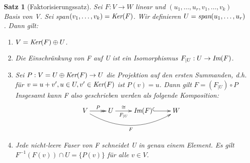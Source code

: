 \documentclass[12pt,a4paper]{article}
\theoremstyle{plain}
\newtheorem{Satz}[Theorem]{Satz}
\numberwithin{equation}{section}
\begin{document}
\begin{Satz} [Faktorisierungssatz]
Sei $F:V\rightarrow W$ linear und $(u_1,\ldots,u_r,v_1,\ldots,v_k)$ Basis von V. Sei \emph{span}$(v_1,\ldots,v_k)=\emph{Ker}(F)$. Wir definieren $U=\emph{span}(u_1,\ldots,u_r)$. Dann gilt:
\begin{enumerate}
\renewcommand{\labelenumi}{\emph{(\roman{enumi})}}
\item $V=\emph{Ker}(F)\oplus U$.
\item Die Einschränkung von F auf U ist ein Isomorphismus $F_{|U}:U\rightarrow \emph{Im}(F)$.
\item Sei $P:V=U\oplus\emph{Ker}(F)\rightarrow U$ die Projektion auf den ersten Summanden, d.h. für $v=u+v', u\in U, v'\in \emph{Ker}(F)$ ist $P(v)=u$. Dann gilt $F=(F_{|U})\circ P$
Insgesamt kann F also geschrieben werden als folgende Komposition:
\[ \begin{xy}
	\xymatrix{
		V \ar@{->>}[r]^P \ar@/_ 0.75cm/[rrr]_F & U \ar[r]^/-.5em/{\cong}_/-.5em/{F_{|U}} & \emph{Im}(F) \ar@{^(->}[r] & W
	}
\end{xy} \]
\item Jede nicht-leere Faser von F schneidet U in genau einem Element. Es gilt $F^{-1}(F(v))\cap U=\{P(v)\}$ für alle $v\in V$.
\end{enumerate}
\end{Satz}
\end{document}
